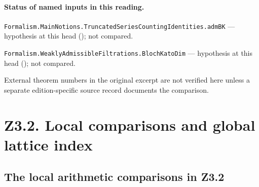 
\paragraph{Status of named inputs in this reading.}
\noindent\nolinkurl{Formalism.MainNotions.TruncatedSeriesCountingIdentities.admBK} --- hypothesis at this head (); not compared.\par
\noindent\nolinkurl{Formalism.WeaklyAdmissibleFiltrations.BlochKatoDim} --- hypothesis at this head (); not compared.\par
External theorem numbers in the original excerpt are not verified here unless a separate edition-specific source record documents the comparison.

\section*{Z3.2. Local comparisons and global lattice index}

\subsection{The local arithmetic comparisons in Z3.2}\label{sec:P-r4-Z32}

